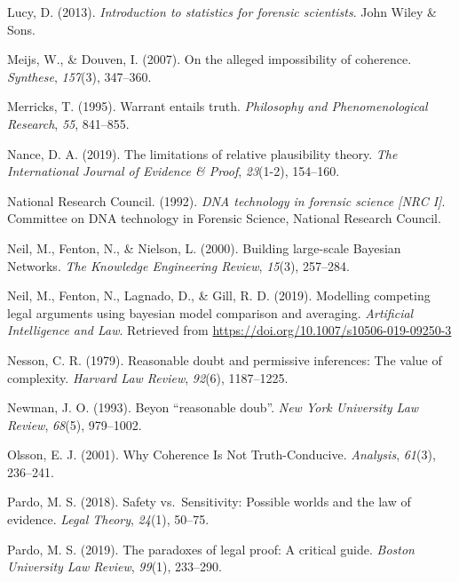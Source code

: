 \documentclass[11pt,dvipsnames,enabledeprecatedfontcommands]{scrartcl}
\begin{document}
\hypertarget{ref-lucy2013introduction}{}
Lucy, D. (2013). \emph{Introduction to statistics for forensic
scientists}. John Wiley \& Sons.

\hypertarget{ref-meijs2007}{}
Meijs, W., \& Douven, I. (2007). On the alleged impossibility of
coherence. \emph{Synthese}, \emph{157}(3), 347--360.

\hypertarget{ref-Merricks1995}{}
Merricks, T. (1995). Warrant entails truth. \emph{Philosophy and
Phenomenological Research}, \emph{55}, 841--855.

\hypertarget{ref-nance2019LimitationsRelativePlausibility}{}
Nance, D. A. (2019). The limitations of relative plausibility theory.
\emph{The International Journal of Evidence \& Proof}, \emph{23}(1-2),
154--160.

\hypertarget{ref-NRCI1992}{}
National Research Council. (1992). \emph{DNA technology in forensic
science \textup{{[}NRC I{]}}}. Committee on DNA technology in Forensic
Science, National Research Council.

\hypertarget{ref-neil2000BuildingLargescaleBayesian}{}
Neil, M., Fenton, N., \& Nielson, L. (2000). Building large-scale
Bayesian Networks. \emph{The Knowledge Engineering Review},
\emph{15}(3), 257--284.

\hypertarget{ref-Fenton2019Modelling}{}
Neil, M., Fenton, N., Lagnado, D., \& Gill, R. D. (2019). Modelling
competing legal arguments using bayesian model comparison and averaging.
\emph{Artificial Intelligence and Law}. Retrieved from
\url{https://doi.org/10.1007/s10506-019-09250-3}

\hypertarget{ref-Nesson1979Reasonable-doub}{}
Nesson, C. R. (1979). Reasonable doubt and permissive inferences: The
value of complexity. \emph{Harvard Law Review}, \emph{92}(6),
1187--1225.

\hypertarget{ref-newman1993}{}
Newman, J. O. (1993). Beyon ``reasonable doub''. \emph{New York
University Law Review}, \emph{68}(5), 979--1002.

\hypertarget{ref-olsson2001}{}
Olsson, E. J. (2001). Why Coherence Is Not Truth-Conducive.
\emph{Analysis}, \emph{61}(3), 236--241.

\hypertarget{ref-pardo2018}{}
Pardo, M. S. (2018). Safety vs.~Sensitivity: Possible worlds and the law
of evidence. \emph{Legal Theory}, \emph{24}(1), 50--75.

\hypertarget{ref-pardo2019}{}
Pardo, M. S. (2019). The paradoxes of legal proof: A critical guide.
\emph{Boston University Law Review}, \emph{99}(1), 233--290.
\end{document}

